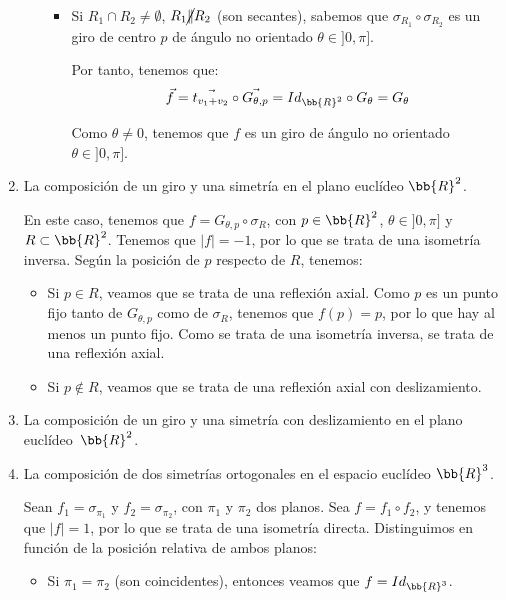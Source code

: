 \begin{ejercicio}
\begin{enumerate}
\begin{itemize}
\begin{itemize}
                \item Si $R_1\cap R_2 \neq \emptyset$, $R_1 \cancel{\|} R_2$ (son secantes), 
                sabemos que $\sigma_{R_1} \circ \sigma_{R_2}$ es un giro de centro $p$ de ángulo no orientado $\theta \in ]0, \pi]$.

                Por tanto, tenemos que:
                \begin{equation*}
                    \vec{f} = \vec{t_{v_1+v_2}} \circ \vec{G_{\theta, p}} = Id_{\bb{R}^2} \circ G_{\theta} = G_{\theta}
                \end{equation*}

                Como $\theta \neq 0$, tenemos que $f$ es un giro de ángulo no orientado $\theta \in ]0, \pi]$.
            \end{itemize}
        \end{itemize}


        \item La composición de un giro y una simetría en el plano euclídeo $\bb{R}^2$.
        
        En este caso, tenemos que $f = G_{\theta, p} \circ \sigma_{R}$, con $p\in \bb{R}^2$, $\theta \in ]0, \pi]$ y $R\subset \bb{R}^2$.
        Tenemos que $|f| = -1$, por lo que se trata de una isometría inversa. Según la posición de $p$ respecto de $R$, tenemos:
        \begin{itemize}
            \item Si $p\in R$, veamos que se trata de una reflexión axial.
            Como $p$ es un punto fijo tanto de $G_{\theta, p}$ como de $\sigma_{R}$, tenemos que $f(p)=p$, por lo que hay al menos un punto fijo.
            Como se trata de una isometría inversa, se trata de una reflexión axial.
            
            \item Si $p\notin R$, veamos que se trata de una reflexión axial con deslizamiento.
        \end{itemize}


        \item La composición de un giro y una simetría con deslizamiento en el plano euclídeo~$\bb{R}^2$.

        \item La composición de dos simetrías ortogonales en el espacio euclídeo $\bb{R}^3$.
        
        Sean $f_1 = \sigma_{\pi_1}$ y $f_2 = \sigma_{\pi_2}$, con $\pi_1$ y $\pi_2$ dos planos.
        Sea $f = f_1 \circ f_2$, y tenemos que $|f| = 1$, por lo que se trata de una isometría directa.
        Distinguimos en función de la posición relativa de ambos planos:
        \begin{itemize}
            \item Si $\pi_1=\pi_2$ (son coincidentes), entonces veamos que $f=Id_{\bb{R}^3}$.
            

\end{itemize}
\end{enumerate}
\end{ejercicio}
